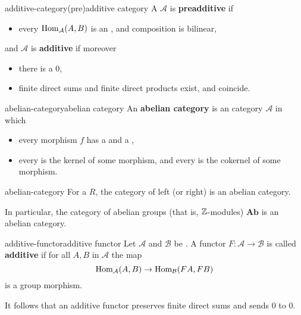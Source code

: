 \begin{topic}{additive-category}{(pre)additive category}
    A  $\mathcal{A}$ is \textbf{preadditive} if
    \begin{itemize}
        \item every $\operatorname{Hom}_\mathcal{A}(A, B)$ is an , and composition is bilinear,
    \end{itemize}
    and $\mathcal{A}$ is \textbf{additive} if moreover
    \begin{itemize}
        \item there is a  $0$,
        \item finite direct sums and finite direct products exist, and coincide.
    \end{itemize}
\end{topic}

\begin{topic}{abelian-category}{abelian category}
    An \textbf{abelian category} is an  category $\mathcal{A}$ in which
    \begin{itemize}
        \item every morphism $f$ has a  and a ,
        \item every  is the kernel of some morphism, and every  is the cokernel of some morphism.
    \end{itemize}
\end{topic}

\begin{example}{abelian-category}
    For a  $R$, the category of left (or right)  is an abelian category.
    
    In particular, the category of abelian groups (that is, $\mathbb{Z}$-modules) $\textbf{Ab}$ is an abelian category.
\end{example}

\begin{topic}{additive-functor}{additive functor}
    Let $\mathcal{A}$ and $\mathcal{B}$ be . A functor $F : \mathcal{A} \to \mathcal{B}$ is called \textbf{additive} if for all $A, B$ in $\mathcal{A}$ the map
    \[ \operatorname{Hom}_\mathcal{A}(A, B) \to \operatorname{Hom}_\mathcal{B}(FA, FB) \]
    is a group morphism.
    
    It follows that an additive functor preserves finite direct sums and sends $0$ to $0$.
\end{topic}

